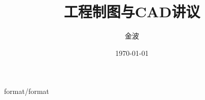\documentclass[12pt,twoside]{book}
\begin{document}
\begin{CJK}{UTF8}{song}
 {format/format}
\title{工程制图与CAD讲议}
\author{金波}
\date{\today}
\maketitle
\CJKtilde
\frontmatter
\tableofcontents
\mainmatter
\graphicspath{{cad/pdf/}{cad/png/}}





% 
% 
% 
% 
% 
% 
% 
% 
% 
% 
% 
% 
% 
% 
% 
%
%

\newpage
\end{CJK}
\end{document}
